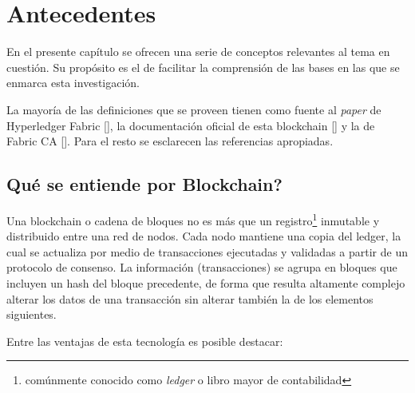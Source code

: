 \chapter{Antecedentes}\label{chapter:state-of-the-art}

En el presente cap\'itulo se ofrecen una serie de conceptos relevantes al tema en cuesti\'on. Su prop\'osito es el de facilitar la comprensi\'on de las bases en las que se enmarca esta investigaci\'on. %

La mayor\'ia de las definiciones que se proveen tienen como fuente al \emph{paper} de Hyperledger Fabric [\cite{androulaki2018hyperledger}], la documentaci\'on oficial de esta blockchain [\cite{hyperledgerorg}] y la de Fabric CA [\cite{fabricca}]. Para el resto se esclarecen las referencias apropiadas.%

\section{\textquestiondown Qu\'e se entiende por Blockchain?}

Una blockchain o cadena de bloques no es m\'as que un registro\footnote{com\'unmente conocido como \emph{ledger} o libro mayor de contabilidad} inmutable y distribuido entre una red de nodos. Cada nodo mantiene una copia del ledger, la cual se actualiza por medio de transacciones ejecutadas y validadas a partir de un protocolo de consenso. La informaci\'on (transacciones) se agrupa en bloques que incluyen un hash del bloque precedente, de forma que resulta altamente complejo alterar los datos de una transacci\'on sin alterar tambi\'en la de los elementos siguientes.


Entre las ventajas de esta tecnolog\'ia es posible destacar:

